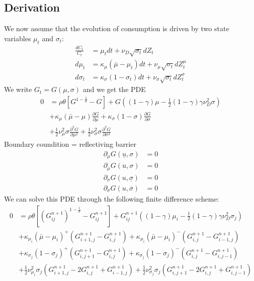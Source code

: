 \documentclass[english]{article}
\begin{document}
\subsection{Derivation}
We now assume that the evolution of consumption is driven by two state variables $\mu_{t}$ and $\sigma_{t}$:
\begin{align*}
	\frac{dC_{t}}{C_{t}} & =  \mu_{t}dt+\nu_{D}\sqrt{\sigma_{t}}dZ_{t}\\
	d\mu_{t} & =  \kappa_{\mu}(\bar{\mu}-\mu_{t})dt+\nu_{\mu}\sqrt{\sigma_{t}}dZ_{t}^{\mu}\\
	d\sigma_{t} & =  \kappa_{\sigma}(1-\sigma_{t})dt+\nu_{\sigma}\sqrt{\sigma_{t}}dZ_{t}^{\sigma}
\end{align*}
We write $G_t = G(\mu, \sigma)$ and we get the PDE
\begin{align*}
	0&= \rho \theta[G^{1-\frac{1}{\theta}}- G]+G((1-\gamma)\mu-\frac{1}{2}(1-\gamma)\gamma\nu_D^2\sigma)\\
	&+ \kappa_{\mu}(\bar{\mu}-\mu)\frac{\partial G}{\partial\mu}+  \kappa_{\sigma}(1-\sigma)\frac{\partial G}{\partial\sigma}\\
	&+\frac{1}{2}\nu_{\mu}^{2}\sigma\frac{\partial^{2}G}{\partial\mu^{2}}+\frac{1}{2}\nu_{\sigma}^{2}\sigma \frac{\partial^{2}G}{\partial\sigma^{2}}
\end{align*}
Boundary coundition  = reflectiving barrier
\begin{align*}
	\partial_\mu G(\underline{u}, \sigma) &= 0  \\
	\partial_\mu G(\overline{u}, \sigma) &= 0 \\
	\partial_\sigma G(u, \underline{\sigma}) &= 0  \\
	\partial_\sigma G(u, \overline{\sigma}) &= 0 
\end{align*}
We can solve this PDE through the following finite difference scheme:
\begin{align*}
	0&= \rho \theta[(G_{ij}^{n+1})^{1-\frac{1}{\theta}}- G_{ij}^{{n+1}}]+G_{ij}^{n+1}((1-\gamma)\mu_i-\frac{1}{2}(1-\gamma)\gamma\nu_D^2\sigma_j)\\
	&+\kappa_{\mu_i}(\bar{\mu}-\mu_i)^+(G_{i+1, j}^{n+1}-G_{i, j}^{n+1}) +\kappa_{\mu_i}(\bar{\mu}-\mu_i)^-(G_{i, j}^{n+1}-G_{i-1, j}^{n+1})\\
	&+\kappa_{\sigma_j}(1-\sigma_j)^+(G_{i, j+1}^{n+1}-G_{i,j}^{n+1}) +\kappa_{\sigma_j}(1-\sigma_j)^-(G_{i, j}^{n+1}-G_{i,j-1}^{n+1})\\
	&+\frac{1}{2}\nu_{\mu_i}^{2}\sigma_j(G_{i+1, j}^{n+1} - 2 G_{i, j}^{n+1} + G_{i-1, j}^{n+1})+\frac{1}{2}\nu_{\sigma_j}^{2}\sigma_j(G_{i, j+1}^{n+1} - 2 G_{i, j}^{n+1} + G_{i, j-1}^{n+1})
\end{align*}
\end{document}
